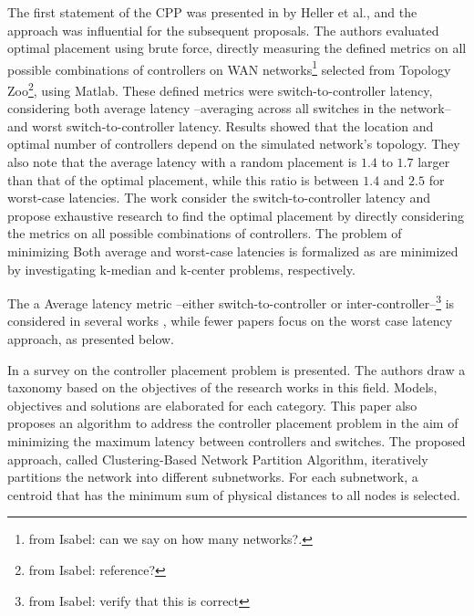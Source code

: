 \documentclass{IEEEtran}
\newcommand\fia[1]{{\color{red}\footnote{\color{red}from Isabel: #1}}} %
\newcommand\mia[1]{{\color{red}#1}}%
\newcommand\delia[1]{{\tiny{\color{red}#1}}} %
\begin{document}
The first statement of the CPP was presented in \cite{HeSh12} by Heller et al., and the approach was influential for the subsequent proposals. The authors evaluated optimal placement using brute force, directly measuring the defined metrics on all possible combinations of controllers on WAN networks\fia{can we say on how many networks?.} selected from Topology Zoo\fia{reference?}, using Matlab. \mia{These defined metrics were switch-to-controller latency, considering both average latency --averaging across all switches in the network-- and worst switch-to-controller latency}. Results showed that the location and \mia{optimal} number of controllers depend on the simulated network's topology. They also note that the average latency with a random placement is $1.4$ to $1.7$ larger than that of the optimal placement, while this ratio is between $1.4$ and $2.5$ for worst-case latencies. \delia{The work consider the switch-to-controller latency and propose exhaustive research to find the optimal placement by directly considering the metrics on all possible combinations of controllers.} \mia{The problem of minimizing} \delia{Both} average and worst-case latencies \mia{is formalized as }\delia{are minimized by investigating} k-median and k-center problems, respectively. 

\delia{The a} \mia{A}verage latency metric \mia{--either switch-to-controller or inter-controller--}\fia{verify that this is correct} is considered in several works \cite{SaSa16, GaWa15, SaSa17, AlAy17, HuLu16, XiQu14, KsBa16}, \mia{while} fewer papers \cite{YaBi14, KiRe18} focus on the worst case latency approach, as presented below.


In \cite{WaZh17} a survey on the controller placement problem is presented. The authors draw a taxonomy based on the objectives of the research works in this field. Models, objectives and solutions are elaborated for each category. This paper also proposes an algorithm to address the controller placement problem in the aim of minimizing the maximum latency between controllers and switches. The proposed approach, called Clustering-Based Network Partition Algorithm, iteratively partitions the network into different subnetworks. For each subnetwork, a centroid that has the minimum sum of physical distances to all nodes is selected. %
\end{document}
